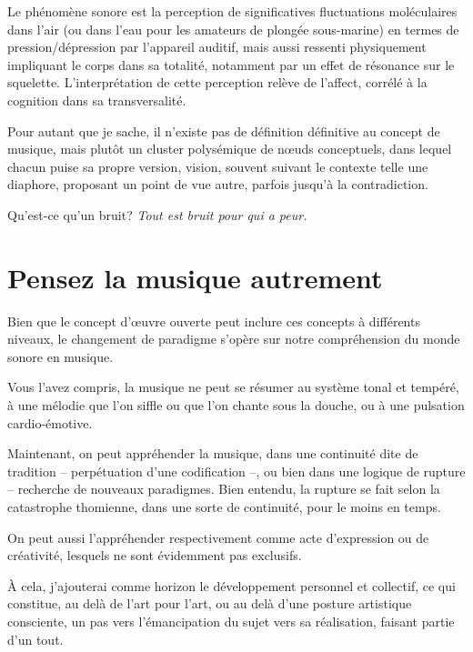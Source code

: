 \documentclass{article}
\begin{document}
Le phénomène sonore est la perception de significatives fluctuations moléculaires dans l'air (ou dans l'eau pour les amateurs de plongée sous-marine) en termes de pression/dépression par l'appareil auditif, mais aussi ressenti physiquement impliquant le corps dans sa totalité, notamment par un effet de résonance sur le squelette. L'interprétation de cette perception relève de l'affect, corrélé à la cognition dans sa transversalité.


Pour autant que je sache, il n'existe pas de définition définitive au concept de musique, mais plutôt un cluster polysémique de nœuds conceptuels, dans lequel chacun puise sa propre version, vision, souvent suivant le contexte telle une diaphore, proposant un point de vue autre, parfois jusqu'à la contradiction.

\bigskip

Qu’est-ce qu'un bruit?  \textit{Tout est bruit pour qui a peur.}
  
\bigskip

\section{Pensez la musique autrement}

Bien que le concept d'œuvre ouverte peut inclure ces concepts à différents niveaux, le changement de paradigme s'opère sur notre compréhension du monde sonore en musique.

\bigskip

Vous l'avez compris, la musique ne peut se résumer au système tonal et tempéré, à une mélodie que l'on siffle ou que l'on chante sous la douche, ou à une pulsation cardio-émotive.

Maintenant, on peut appréhender la musique, dans une continuité dite de tradition -- perpétuation d'une codification --, ou bien dans une logique de rupture -- recherche de nouveaux paradigmes. Bien entendu, la rupture se fait selon la catastrophe thomienne, dans une sorte de continuité, pour le moins en temps. 

On peut aussi l'appréhender respectivement comme acte d'expression ou de créativité, lesquels ne sont évidemment pas exclusifs.

À cela, j'ajouterai comme horizon le développement personnel et collectif, ce qui constitue, au delà de l'art pour l'art, ou au delà d'une posture artistique consciente, un pas vers l'émancipation du sujet vers sa réalisation, faisant partie d'un tout.
\end{document}
